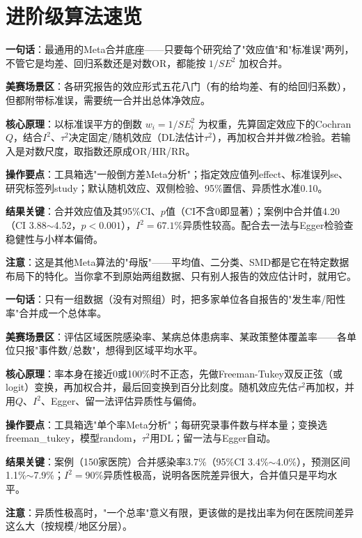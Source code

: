 \section{进阶级算法速览}


\begin{algobrief}
\textbf{一句话}：最通用的Meta合并底座——只要每个研究给了"效应值"和"标准误"两列，不管它是均差、回归系数还是对数OR，都能按 $1/SE^2$ 加权合并。

\textbf{美赛场景区}：各研究报告的效应形式五花八门（有的给均差、有的给回归系数），但都附带标准误，需要统一合并出总体净效应。

\textbf{核心原理}：以标准误平方的倒数 $w_i=1/SE_i^2$ 为权重，先算固定效应下的Cochran $Q$，结合$I^2$、$\tau^2$决定固定/随机效应（DL法估计$\tau^2$），再加权合并并做$Z$检验。若输入是对数尺度，取指数还原成OR/HR/RR。

\textbf{操作要点}：工具箱选"一般倒方差Meta分析"；指定效应值列effect、标准误列se、研究标签列study；默认随机效应、双侧检验、95\%置信、异质性水准0.10。

\textbf{结果关键}：合并效应值及其95\%CI、$p$值（CI不含0即显著）；案例中合并值4.20（CI 3.88$\sim$4.52，$p<0.001$），$I^2=67.1\%$异质性较高。配合去一法与Egger检验查稳健性与小样本偏倚。

\textbf{注意}：这是其他Meta算法的"母版"——平均值、二分类、SMD都是它在特定数据布局下的特化。当你拿不到原始两组数据、只有别人报告的效应估计时，就用它。
\end{algobrief}


\begin{algobrief}
\textbf{一句话}：只有一组数据（没有对照组）时，把多家单位各自报告的"发生率/阳性率"合并成一个总体率。

\textbf{美赛场景区}：评估区域医院感染率、某病总体患病率、某政策整体覆盖率——各单位只报"事件数/总数"，想得到区域平均水平。

\textbf{核心原理}：率本身在接近0或100\%时不正态，先做Freeman-Tukey双反正弦（或logit）变换，再加权合并，最后回变换到百分比刻度。随机效应先估$\tau^2$再加权，并用$Q$、$I^2$、Egger、留一法评估异质性与偏倚。

\textbf{操作要点}：工具箱选"单个率Meta分析"；每研究录事件数与样本量；变换选freeman\_tukey，模型random，$\tau^2$用DL；留一法与Egger自动。

\textbf{结果关键}：案例（150家医院）合并感染率3.7\%（95\%CI 3.4\%$\sim$4.0\%），预测区间1.1\%$\sim$7.9\%；$I^2=90\%$异质性极高，说明各医院差异很大，合并值只是平均水平。

\textbf{注意}：异质性极高时，"一个总率"意义有限，更该做的是找出率为何在医院间差异这么大（按规模/地区分层）。
\end{algobrief}

